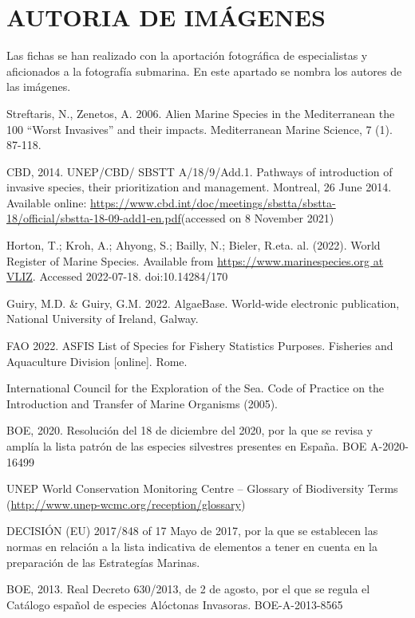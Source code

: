 \documentclass{article}
\begin{document}
\section*{AUTORIA DE IMÁGENES}
Las fichas se han realizado con la  aportación fotográfica de especialistas y aficionados a la fotografía submarina. En este apartado se nombra los autores de las imágenes.


\begin{thebibliography}{18}
Streftaris, N., Zenetos, A. 2006. Alien Marine Species in the Mediterranean the 100 “Worst Invasives” and their impacts. Mediterranean Marine Science, 7 (1). 87-118.

CBD, 2014. UNEP/CBD/ SBSTT A/18/9/Add.1. Pathways of introduction of invasive species, their prioritization and management. Montreal, 26 June 2014.  Available online: \url{https://www.cbd.int/doc/meetings/sbstta/sbstta-18/official/sbstta-18-09-add1-en.pdf}(accessed on 8 November 2021)

Horton, T.; Kroh, A.; Ahyong, S.; Bailly, N.; Bieler, R.eta. al. (2022). World Register of Marine Species. Available from \url{https://www.marinespecies.org at VLIZ}. Accessed 2022-07-18. doi:10.14284/170

Guiry, M.D. \& Guiry, G.M. 2022. AlgaeBase. World-wide electronic publication, National University of Ireland, Galway.

FAO 2022. ASFIS List of Species for Fishery Statistics Purposes. Fisheries and Aquaculture Division [online]. Rome. 

International Council for the Exploration of the Sea. Code of Practice on the Introduction and Transfer of Marine Organisms (2005).

BOE, 2020. Resolución del 18 de diciembre del 2020, por la que se revisa y amplía la lista patrón de las especies silvestres presentes en España.  BOE A-2020-16499

UNEP World Conservation Monitoring Centre – Glossary of Biodiversity Terms (\url{http://www.unep-wcmc.org/reception/glossary})

DECISIÓN (EU) 2017/848 of 17 Mayo de 2017, por la que se establecen las normas en relación a la lista indicativa de elementos a tener en cuenta en la preparación de las Estrategías Marinas. 

BOE, 2013. Real Decreto 630/2013, de 2 de agosto, por el que se regula el Catálogo español de especies Alóctonas Invasoras. BOE-A-2013-8565


\end{thebibliography}
\end{document}
